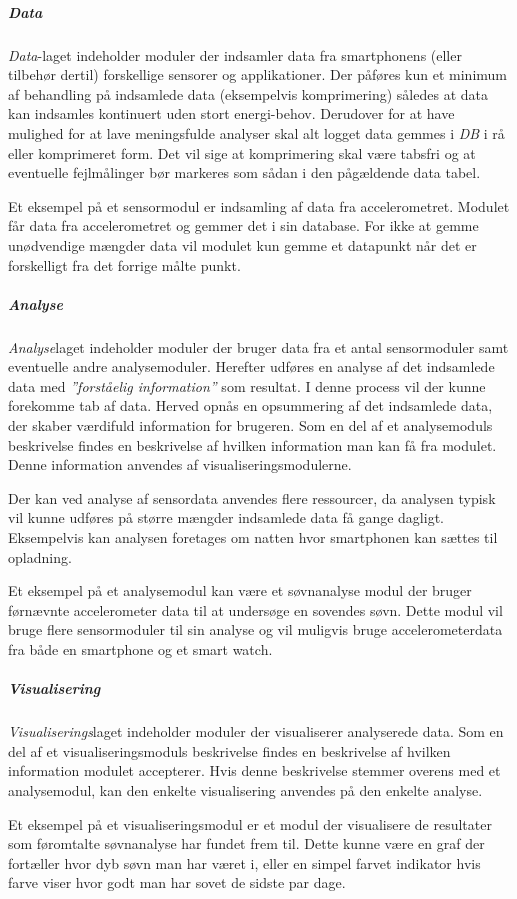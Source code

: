 \subparagraph{Data}
\textit{Data}-laget indeholder moduler der indsamler data fra smartphonens (eller tilbehør dertil) forskellige sensorer og applikationer.
Der påføres kun et minimum af behandling på indsamlede data (eksempelvis komprimering) således at data kan indsamles kontinuert uden stort energi-behov.
Derudover for at have mulighed for at lave meningsfulde analyser skal alt logget data gemmes i \textit{DB} i rå eller komprimeret form.
Det vil sige at komprimering skal være tabsfri og at eventuelle fejlmålinger bør markeres som sådan i den pågældende data tabel.

Et eksempel på et sensormodul er indsamling af data fra accelerometret.
Modulet får data fra accelerometret og gemmer det i sin database. 
For ikke at gemme unødvendige mængder data vil modulet kun gemme et datapunkt når det er forskelligt fra det forrige målte punkt.

\subparagraph{Analyse}
\textit{Analyse}laget indeholder moduler der bruger data fra et antal sensormoduler samt eventuelle andre analysemoduler.
Herefter udføres en analyse af det indsamlede data med \textit{''forståelig information''} som resultat.
I denne process vil der kunne forekomme tab af data.
Herved opnås en opsummering af det indsamlede data, der skaber værdifuld information for brugeren.
Som en del af et analysemoduls beskrivelse findes en beskrivelse af hvilken information man kan få fra modulet.
Denne information anvendes af visualiseringsmodulerne.

Der kan ved analyse af sensordata anvendes flere ressourcer, da analysen typisk vil kunne udføres på større mængder indsamlede data få gange dagligt.
Eksempelvis kan analysen foretages om natten hvor smartphonen kan sættes til opladning.

Et eksempel på et analysemodul kan være et søvnanalyse modul der bruger førnævnte accelerometer data til at undersøge en sovendes søvn.
Dette modul vil bruge flere sensormoduler til sin analyse og vil muligvis bruge accelerometerdata fra både en smartphone og et smart watch.

\subparagraph{Visualisering}
\textit{Visualiserings}laget indeholder moduler der visualiserer analyserede data.
Som en del af et visualiseringsmoduls beskrivelse findes en beskrivelse af hvilken information modulet accepterer.
Hvis denne beskrivelse stemmer overens med et analysemodul, kan den enkelte visualisering anvendes på den enkelte analyse.

Et eksempel på et visualiseringsmodul er et modul der visualisere de resultater som føromtalte søvnanalyse har fundet frem til.
Dette kunne være en graf der fortæller hvor dyb søvn man har været i, eller en simpel farvet indikator hvis farve viser hvor godt man har sovet de sidste par dage.

